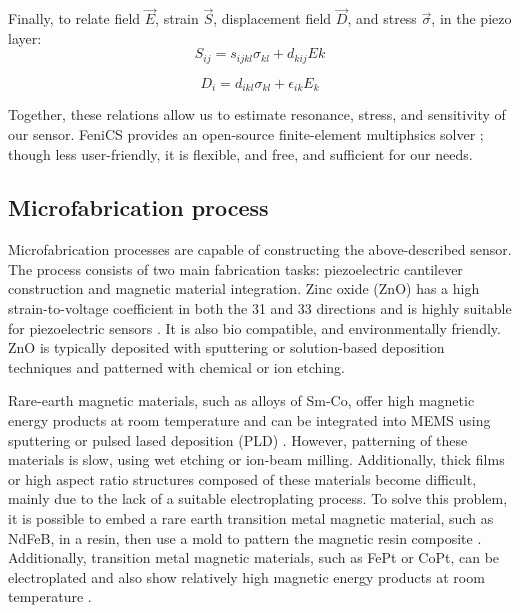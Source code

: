 Finally, to relate field $\vec{E}$, strain $\vec{S}$, displacement field $\vec{D}$, and stress $\vec{\sigma}$, in the piezo layer:
 $$S_{ij} = s_{ijkl}\sigma_{kl}+d_{kij}E{k}$$

$$D_i=d_{ikl}\sigma_{kl}+\epsilon_{ik}E_{k}$$
 
Together, these relations allow us to estimate resonance, stress, and sensitivity of our sensor. FeniCS provides an open-source finite-element multiphsics solver \cite{dupont2003fenics}; though less user-friendly, it is flexible, and free, and sufficient for our needs.


\subsection{Microfabrication process}
Microfabrication processes are capable of constructing the above-described sensor. The process consists of two main fabrication tasks: piezoelectric cantilever construction and magnetic material integration. Zinc oxide (ZnO) has a high strain-to-voltage coefficient in both the 31 and 33 directions and is highly suitable for piezoelectric sensors \cite{tadigadapa2009piezoelectric}. It is also bio compatible, and environmentally friendly. ZnO is typically deposited with sputtering or solution-based deposition techniques \cite{znaidi2010sol} and patterned with chemical or ion etching.

Rare-earth magnetic materials, such as alloys of Sm-Co, offer high magnetic energy products at room temperature and can be integrated into MEMS using sputtering or pulsed lased deposition (PLD)  \cite{arnold2009permanent}. However, patterning of these materials is slow, using wet etching or ion-beam milling. Additionally, thick films or high aspect ratio structures composed of these materials become difficult, mainly due to the lack of a suitable electroplating process. To solve this problem, it is possible to embed a rare earth transition metal magnetic material, such as NdFeB, in a resin, then use a mold to pattern the magnetic resin composite \cite{wang2013resin}. Additionally, transition metal magnetic materials, such as FePt or CoPt, can be electroplated and also show relatively high magnetic energy products at room temperature \cite{arnold2009permanent,chin2000permanent}.


